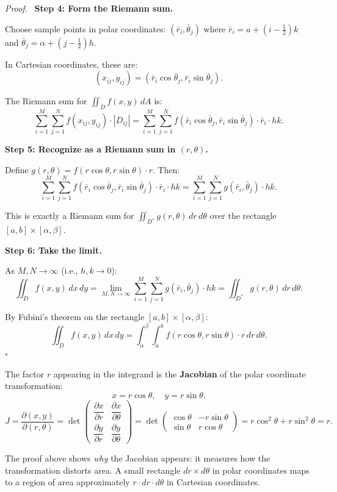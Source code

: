 \documentclass[11pt]{report}
\renewenvironment{proof}[1][Proof]{\par\noindent\textit{#1.}\ }{\hfill$\square$\par\medskip}
\begin{document}
\begin{proof}
\textbf{Step 4: Form the Riemann sum.}

Choose sample points in polar coordinates: $(\bar{r}_i, \bar{\theta}_j)$ where $\bar{r}_i = a + (i - \frac{1}{2})k$ and $\bar{\theta}_j = \alpha + (j - \frac{1}{2})h$.

In Cartesian coordinates, these are:
\[
(x_{ij}, y_{ij}) = (\bar{r}_i \cos\bar{\theta}_j, \bar{r}_i \sin\bar{\theta}_j).
\]

The Riemann sum for $\iint_D f(x, y) \, dA$ is:
\[
\sum_{i=1}^{M} \sum_{j=1}^{N} f(x_{ij}, y_{ij}) \cdot |D_{ij}| = \sum_{i=1}^{M} \sum_{j=1}^{N} f(\bar{r}_i \cos\bar{\theta}_j, \bar{r}_i \sin\bar{\theta}_j) \cdot \bar{r}_i \cdot hk.
\]

\textbf{Step 5: Recognize as a Riemann sum in $(r, \theta)$.}

Define $g(r, \theta) = f(r\cos\theta, r\sin\theta) \cdot r$. Then:
\[
\sum_{i=1}^{M} \sum_{j=1}^{N} f(\bar{r}_i \cos\bar{\theta}_j, \bar{r}_i \sin\bar{\theta}_j) \cdot \bar{r}_i \cdot hk = \sum_{i=1}^{M} \sum_{j=1}^{N} g(\bar{r}_i, \bar{\theta}_j) \cdot hk.
\]

This is exactly a Riemann sum for $\iint_{D^*} g(r, \theta) \, dr\, d\theta$ over the rectangle $[a, b] \times [\alpha, \beta]$.

\textbf{Step 6: Take the limit.}

As $M, N \to \infty$ (i.e., $h, k \to 0$):
\[
\iint_D f(x, y) \, dx\, dy = \lim_{M, N \to \infty} \sum_{i=1}^{M} \sum_{j=1}^{N} g(\bar{r}_i, \bar{\theta}_j) \cdot hk = \iint_{D^*} g(r, \theta) \, dr\, d\theta.
\]

By Fubini's theorem on the rectangle $[a, b] \times [\alpha, \beta]$:
\[
\iint_D f(x, y) \, dx\, dy = \int_\alpha^\beta \int_a^b f(r\cos\theta, r\sin\theta) \cdot r \, dr \, d\theta.
\]
\end{proof}

\begin{remark}
The factor $r$ appearing in the integrand is the \textbf{Jacobian} of the polar coordinate transformation:
\[
x = r\cos\theta, \quad y = r\sin\theta.
\]
\[
J = \frac{\partial(x, y)}{\partial(r, \theta)} = \det \begin{pmatrix} \dfrac{\partial x}{\partial r} & \dfrac{\partial x}{\partial \theta} \\[8pt] \dfrac{\partial y}{\partial r} & \dfrac{\partial y}{\partial \theta} \end{pmatrix} = \det \begin{pmatrix} \cos\theta & -r\sin\theta \\ \sin\theta & r\cos\theta \end{pmatrix} = r\cos^2\theta + r\sin^2\theta = r.
\]

The proof above shows \emph{why} the Jacobian appears: it measures how the transformation distorts area. A small rectangle $dr \times d\theta$ in polar coordinates maps to a region of area approximately $r \cdot dr \cdot d\theta$ in Cartesian coordinates.
\end{remark}
\end{document}
